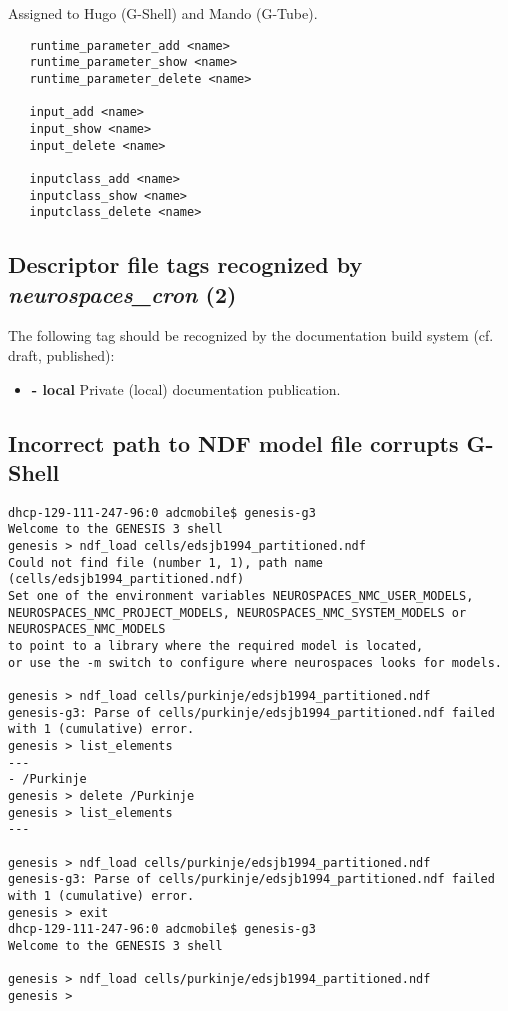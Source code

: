 \documentclass[12pt]{article}
\begin{document}
Assigned to Hugo (G-Shell) and Mando (G-Tube).

\begin{verbatim}
   runtime_parameter_add <name>
   runtime_parameter_show <name>
   runtime_parameter_delete <name>

   input_add <name>
   input_show <name>
   input_delete <name>

   inputclass_add <name>
   inputclass_show <name>
   inputclass_delete <name>
\end{verbatim}

\subsection{Descriptor file tags recognized by {\it neurospaces\_cron} (2)}

The following tag should be recognized by the documentation build
system (cf. draft, published):
\begin{itemize}
    \item[]{\bf - local} Private (local) documentation publication.
\end{itemize}


\subsection{Incorrect path to NDF model file corrupts G-Shell}
\begin{verbatim}
dhcp-129-111-247-96:0 adcmobile$ genesis-g3
Welcome to the GENESIS 3 shell
genesis > ndf_load cells/edsjb1994_partitioned.ndf
Could not find file (number 1, 1), path name (cells/edsjb1994_partitioned.ndf)
Set one of the environment variables NEUROSPACES_NMC_USER_MODELS,
NEUROSPACES_NMC_PROJECT_MODELS, NEUROSPACES_NMC_SYSTEM_MODELS or NEUROSPACES_NMC_MODELS
to point to a library where the required model is located,
or use the -m switch to configure where neurospaces looks for models.

genesis > ndf_load cells/purkinje/edsjb1994_partitioned.ndf
genesis-g3: Parse of cells/purkinje/edsjb1994_partitioned.ndf failed with 1 (cumulative) error.
genesis > list_elements
---
- /Purkinje
genesis > delete /Purkinje
genesis > list_elements
---

genesis > ndf_load cells/purkinje/edsjb1994_partitioned.ndf
genesis-g3: Parse of cells/purkinje/edsjb1994_partitioned.ndf failed with 1 (cumulative) error.
genesis > exit
dhcp-129-111-247-96:0 adcmobile$ genesis-g3
Welcome to the GENESIS 3 shell

genesis > ndf_load cells/purkinje/edsjb1994_partitioned.ndf
genesis >
\end{verbatim}
\end{document}
